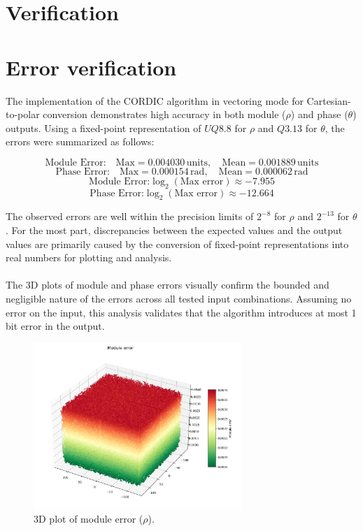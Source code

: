 \begin{code}
    \label{code:testbench_graph}
\end{code}

\section{Verification}

\section{Error verification}
The implementation of the CORDIC algorithm in vectoring mode for Cartesian-to-polar conversion demonstrates 
high accuracy in both module (\( \rho \)) and phase (\( \theta \)) outputs. Using a fixed-point 
representation of \( UQ8.8 \) for \( \rho \) and \( Q3.13 \) for \( \theta \), the errors were summarized as follows:

\[
\text{Module Error:} \quad \text{Max} = 0.004030 \, \text{units}, \quad \text{Mean} = 0.001889 \, \text{units}
\]
\[
\text{Phase Error:} \quad \text{Max} = 0.000154 \, \text{rad}, \quad \text{Mean} = 0.000062 \, \text{rad}
\]
\[
    \text{Module Error:} \log_2(\text{Max error}) \approx -7.955
\]
\[
    \text{Phase Error:} \log_2(\text{Max error}) \approx -12.664
\]

The observed errors are well within the precision limits of \( 2^{-8} \) for \( \rho \) and \( 2^{-13} \) for \( \theta \). For the most part, discrepancies between the expected values and the output values are primarily caused by the conversion of fixed-point representations into real numbers for plotting and analysis.
\\\\
The 3D plots of module and phase errors visually confirm the bounded and negligible nature of the errors across 
all tested input combinations. Assuming no error on the input, this analysis validates that the algorithm introduces 
at most 1 bit error in the output.

\begin{figure}[H]
    \centering
    \includegraphics[width=0.7\textwidth]{./images/Verification/module_error.png}
    \caption{3D plot of module error (\( \rho \)).}
    \label{fig:module_error}
\end{figure}

